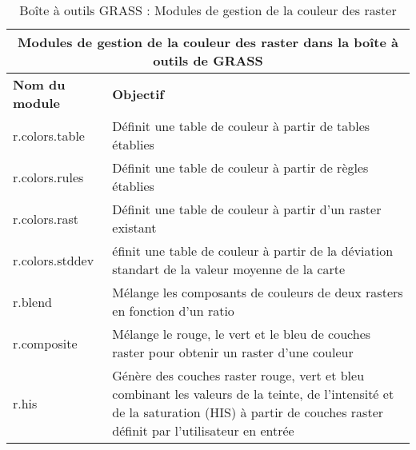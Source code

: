 \begin{table}[H]
\centering
 \begin{tabular}{|p{4cm}|p{10cm}|}
  \hline \multicolumn{2}{|c|}{\textbf{Modules de gestion de la couleur des raster dans la boîte à outils de GRASS}} \\
  \hline \textbf{Nom du module} & \textbf{Objectif} \\
  \hline r.colors.table & Définit une table de couleur à partir de tables établies \\
  \hline r.colors.rules & Définit une table de couleur à partir de règles établies \\
  \hline r.colors.rast & Définit une table de couleur à partir d'un raster existant \\
  \hline r.colors.stddev & éfinit une table de couleur à partir de la déviation standart de la valeur moyenne de la carte \\
  \hline r.blend & Mélange les composants de couleurs de deux rasters en fonction d'un ratio \\
  \hline r.composite & Mélange le rouge, le vert et le bleu de couches raster pour obtenir un raster d'une couleur \\
  \hline r.his & Génère des couches raster rouge, vert et bleu combinant les valeurs de la teinte, de l'intensité et de la saturation (HIS) à partir de couches raster définit par l'utilisateur en entrée \\
\hline
\end{tabular}
\caption{Boîte à outils GRASS : Modules de gestion de la couleur des raster}
\end{table}


